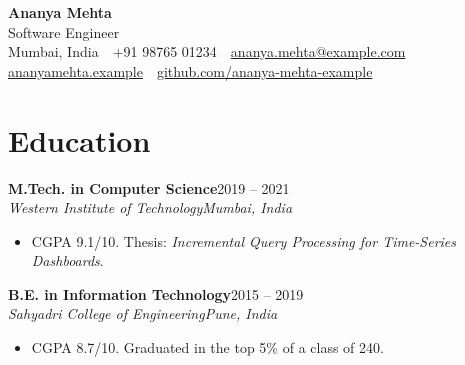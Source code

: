 \documentclass[10pt,a4paper]{article}
\newcommand{\entry}[4]{\textbf{#1}\hfill #2\\\textit{#3}\hfill \textit{#4}\par\vspace{1pt}}
\begin{document}
\begin{center}
  {\Huge\bfseries Ananya Mehta}\\[5pt]
  Software Engineer\\[4pt]
  Mumbai, India \,\textbar\, +91 98765 01234 \,\textbar\,
  \href{mailto:ananya.mehta@example.com}{ananya.mehta@example.com} \,\textbar\,
  \href{https://ananyamehta.example}{ananyamehta.example} \,\textbar\,
  \href{https://github.com/ananya-mehta-example}{github.com/ananya-mehta-example}
\end{center}

\section{Education}
\entry{M.Tech. in Computer Science}{2019 -- 2021}{Western Institute of Technology}{Mumbai, India}
\begin{itemize}
  \item CGPA 9.1/10. Thesis: \emph{Incremental Query Processing for Time-Series Dashboards}.
\end{itemize}
\vspace{3pt}
\entry{B.E. in Information Technology}{2015 -- 2019}{Sahyadri College of Engineering}{Pune, India}
\begin{itemize}
  \item CGPA 8.7/10. Graduated in the top 5\% of a class of 240.
\end{itemize}
\end{document}
